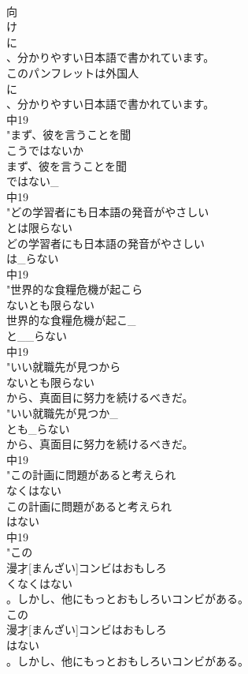\documentclass[8pt]{extreport}
\begin{document}
\begin{CJK}{UTF8}{min}
\\	向
\\	け
\\	に
\\	、分かりやすい日本語で書かれています。
\\	このパンフレットは外国人
\\	に
\\	、分かりやすい日本語で書かれています。
\\	中19
\\	"まず、彼を言うことを聞
\\	こうではないか
\\	まず、彼を言うことを聞
\\	ではない_
\\	中19
\\	"どの学習者にも日本語の発音がやさしい
\\	とは限らない
\\	どの学習者にも日本語の発音がやさしい
\\	は_らない
\\	中19
\\	"世界的な食糧危機が起こら
\\	ないとも限らない
\\	世界的な食糧危機が起こ_
\\	と__らない
\\	中19
\\	"いい就職先が見つから
\\	ないとも限らない
\\	から、真面目に努力を続けるべきだ。
\\	"いい就職先が見つか_
\\	とも_らない
\\	から、真面目に努力を続けるべきだ。
\\	中19
\\	"この計画に問題があると考えられ
\\	なくはない
\\	この計画に問題があると考えられ
\\	はない
\\	中19
\\	"この
\\	漫才[まんざい]コンビはおもしろ
\\	くなくはない
\\	。しかし、他にもっとおもしろいコンビがある。
\\	この
\\	漫才[まんざい]コンビはおもしろ
\\	はない
\\	。しかし、他にもっとおもしろいコンビがある。

\end{CJK}
\end{document}
